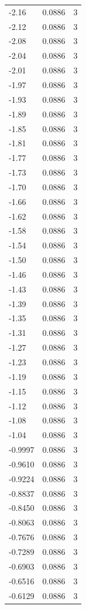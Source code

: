 \begin{longtable}{lrr}
  -2.16 & 0.0886 & 3 \\
  -2.12 & 0.0886 & 3 \\
  -2.08 & 0.0886 & 3 \\
  -2.04 & 0.0886 & 3 \\
  -2.01 & 0.0886 & 3 \\
  -1.97 & 0.0886 & 3 \\
  -1.93 & 0.0886 & 3 \\
  -1.89 & 0.0886 & 3 \\
  -1.85 & 0.0886 & 3 \\
  -1.81 & 0.0886 & 3 \\
  -1.77 & 0.0886 & 3 \\
  -1.73 & 0.0886 & 3 \\
  -1.70 & 0.0886 & 3 \\
  -1.66 & 0.0886 & 3 \\
  -1.62 & 0.0886 & 3 \\
  -1.58 & 0.0886 & 3 \\
  -1.54 & 0.0886 & 3 \\
  -1.50 & 0.0886 & 3 \\
  -1.46 & 0.0886 & 3 \\
  -1.43 & 0.0886 & 3 \\
  -1.39 & 0.0886 & 3 \\
  -1.35 & 0.0886 & 3 \\
  -1.31 & 0.0886 & 3 \\
  -1.27 & 0.0886 & 3 \\
  -1.23 & 0.0886 & 3 \\
  -1.19 & 0.0886 & 3 \\
  -1.15 & 0.0886 & 3 \\
  -1.12 & 0.0886 & 3 \\
  -1.08 & 0.0886 & 3 \\
  -1.04 & 0.0886 & 3 \\
  -0.9997 & 0.0886 & 3 \\
  -0.9610 & 0.0886 & 3 \\
  -0.9224 & 0.0886 & 3 \\
  -0.8837 & 0.0886 & 3 \\
  -0.8450 & 0.0886 & 3 \\
  -0.8063 & 0.0886 & 3 \\
  -0.7676 & 0.0886 & 3 \\
  -0.7289 & 0.0886 & 3 \\
  -0.6903 & 0.0886 & 3 \\
  -0.6516 & 0.0886 & 3 \\
  -0.6129 & 0.0886 & 3 \\

\end{longtable}
